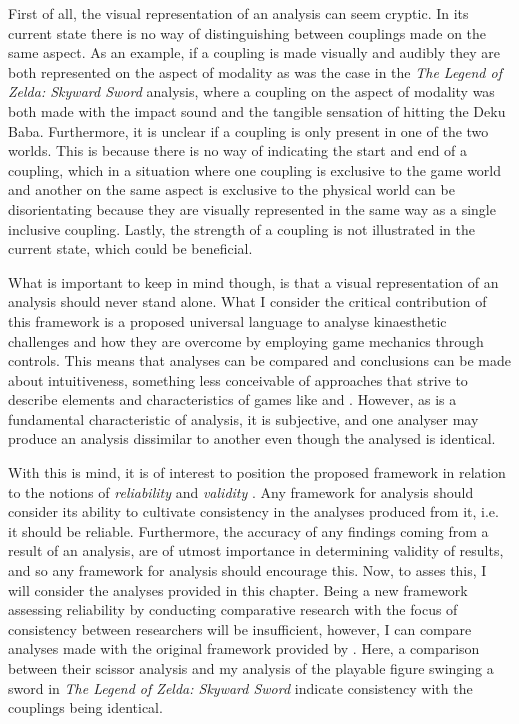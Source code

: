 First of all, the visual representation of an analysis can seem cryptic. In its current state there is no way of distinguishing between couplings made on the same aspect. As an example, if a coupling is made visually and audibly they are both represented on the aspect of modality as was the case in the \textit{The Legend of Zelda: Skyward Sword} \cite{skyward} analysis, where a coupling on the aspect of modality was both made with the impact sound and the tangible sensation of hitting the Deku Baba. Furthermore, it is unclear if a coupling is only present in one of the two worlds. This is because there is no way of indicating the start and end of a coupling, which in a situation where one coupling is exclusive to the game world and another on the same aspect is exclusive to the physical world can be disorientating because they are visually represented in the same way as a single inclusive coupling. Lastly, the strength of a coupling is not illustrated in the current state, which could be beneficial.

What is important to keep in mind though, is that a visual representation of an analysis should never stand alone. What I consider the critical contribution of this framework is a proposed universal language to analyse kinaesthetic challenges and how they are overcome by employing game mechanics through controls. This means that analyses can be compared and conclusions can be made about intuitiveness, something less conceivable of approaches that strive to describe elements and characteristics of games like  and . However, as is a fundamental characteristic of analysis, it is subjective, and one analyser may produce an analysis dissimilar to another even though the analysed is identical.

With this is mind, it is of interest to position the proposed framework in relation to the notions of \textit{reliability} and \textit{validity} \cite{cresswell}. Any framework for analysis should consider its ability to cultivate consistency in the analyses produced from it, i.e. it should be reliable. Furthermore, the accuracy of any findings coming from a result of an analysis, are of utmost importance in determining validity of results, and so any framework for analysis should encourage this. Now, to asses this, I will consider the analyses provided in this chapter. Being a new framework assessing reliability by conducting comparative research with the focus of consistency between researchers will be insufficient, however, I can compare analyses made with the original framework provided by . Here, a comparison between their scissor analysis and my analysis of the playable figure swinging a sword in \textit{The Legend of Zelda: Skyward Sword} \cite{skyward} indicate consistency with the couplings being identical.


